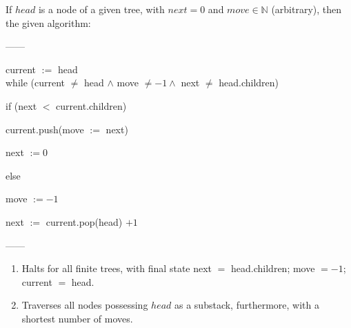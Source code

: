 \documentclass[twoside]{article}
\begin{document}
If $ head $ is a node of a given tree, with $ next = 0 $ and $ move\in\mathbb{N} $ (arbitrary), then the given algorithm:

------

\hspace{5cm} current $ := $ head\\[0.1cm]

\hspace{5cm} while (current $ \neq $ head $ \wedge $ move $ \neq -1\wedge $ next $ \neq $ head.children)

\hspace{6cm} if (next $ < $ current.children)

\hspace{7cm} current.push(move $ := $ next)

\hspace{7cm} next $ := 0 $

\hspace{6cm} else

\hspace{7cm} move $ := -1 $

\hspace{7cm} next $ := $ current.pop(head) $ + 1 $

------

\begin{enumerate}
\item Halts for all finite trees, with final state next $ = $ head.children; move $ = -1 $; current $ = $ head.
\item Traverses all nodes possessing $ head $ as a substack, furthermore, with a shortest number of moves.
\end{enumerate}
\end{document}
